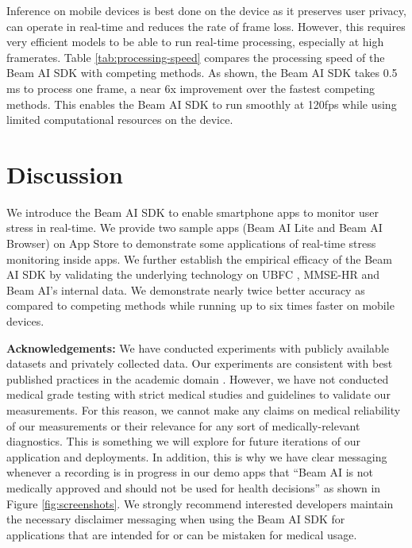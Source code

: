 \documentclass{article}
\begin{document}
Inference on mobile devices is best done on the device as it preserves user privacy, can operate in real-time and reduces the rate of frame loss. However, this requires very efficient models to be able to run real-time processing, especially at high framerates. Table \ref{tab:processing-speed} compares the processing speed of the Beam AI SDK with competing methods. As shown, the Beam AI SDK takes 0.5 ms to process one frame, a near 6x improvement over the fastest competing methods. This enables the Beam AI SDK to run smoothly at 120fps while using limited computational resources on the device.

\section{Discussion}
\label{sec:discussion}

We introduce the Beam AI SDK to enable smartphone apps to monitor user stress in real-time. We provide two sample apps (Beam AI Lite and Beam AI Browser) on App Store to demonstrate some applications of real-time stress monitoring inside apps. We further establish the empirical efficacy of the Beam AI SDK by validating the underlying technology on UBFC \cite{Bobbia17_UBFC}, MMSE-HR \cite{Zhang16_MMSE} and Beam AI's internal data. We demonstrate nearly twice better accuracy as compared to competing methods while running up to six times faster on mobile devices.

\textbf{Acknowledgements:} We have conducted experiments with publicly available datasets and privately collected data. Our experiments are consistent with best published practices in the academic domain \cite{TSCAN_Liu2020, EfficientPhys_Liu2021, MetaPhys_Liu2021, ICA_Poh2011, POS_Wang2016}. However, we have not conducted medical grade testing with strict medical studies and guidelines to validate our measurements. For this reason, we cannot make any claims on medical reliability of our measurements or their relevance for any sort of medically-relevant diagnostics. This is something we will explore for future iterations of our application and deployments. In addition, this is why we have clear messaging whenever a recording is in progress in our demo apps that ``Beam AI is not medically approved and should not be used for health decisions'' as shown in Figure \ref{fig:screenshots}. We strongly recommend interested developers maintain the necessary disclaimer messaging when using the Beam AI SDK for applications that are intended for or can be mistaken for medical usage.
\end{document}

